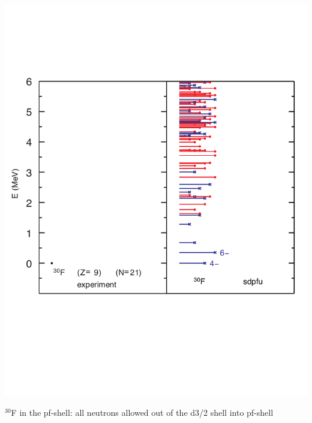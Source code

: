 \documentclass[12pt]{article}
\begin{document}
\includegraphics[width=\textwidth]{f_30u-3n.pdf}

\newpage

$^{30}$F in the pf-shell: all neutrons allowed out of the d3/2 shell into pf-shell
\end{document}
